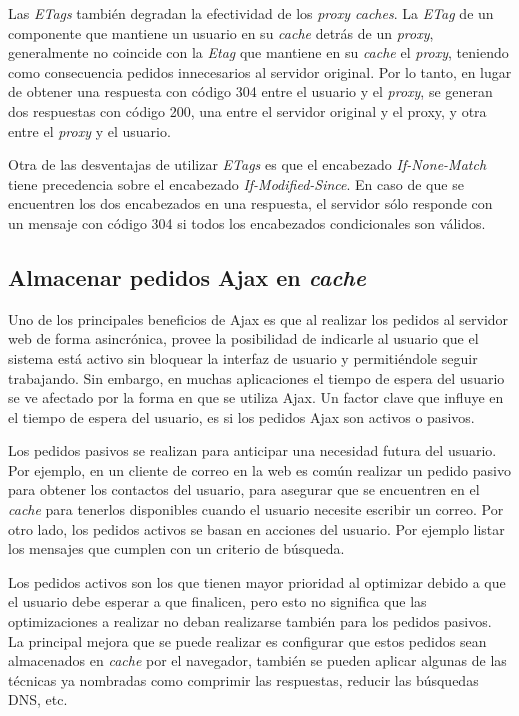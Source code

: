 Las \emph{ETags} también degradan la efectividad de los \emph{proxy caches}. La \emph{ETag} de un componente que mantiene un usuario en su \emph{cache} detrás de un
\emph{proxy}, generalmente no coincide con la \emph{Etag} que mantiene en su \emph{cache} el \emph{proxy}, teniendo como consecuencia pedidos innecesarios al servidor
original. Por lo tanto, en lugar de obtener una respuesta con código 304 entre el usuario y el \emph{proxy}, se generan dos respuestas con código 200, una entre el
servidor original y el proxy, y otra entre el \emph{proxy} y el usuario.

Otra de las desventajas de utilizar \emph{ETags} es que el encabezado \emph{If-None-Match} tiene precedencia sobre el encabezado \emph{If-Modified-Since}. En caso de que
se encuentren los dos encabezados en una respuesta, el servidor sólo responde con un mensaje con código 304 si todos los encabezados condicionales son válidos.

\subsection{Almacenar pedidos Ajax en \emph{cache}}

Uno de los principales beneficios de Ajax es que al realizar  los pedidos al servidor web de forma
asincrónica, provee la posibilidad de indicarle al usuario que el sistema está activo sin bloquear la
interfaz de usuario y permitiéndole seguir trabajando.
Sin embargo, en muchas aplicaciones el tiempo de espera del usuario se ve afectado por la forma en que se utiliza Ajax. Un factor clave que influye en el tiempo de espera del usuario, es si
los pedidos Ajax son activos o pasivos.

Los pedidos pasivos se realizan para anticipar una necesidad futura del usuario. Por ejemplo, en un cliente de correo en la web es común realizar un pedido pasivo para
obtener los contactos del usuario, para asegurar que se encuentren en el \emph{cache} para tenerlos disponibles cuando el usuario necesite escribir un correo.
Por otro lado, los pedidos activos se basan en acciones del usuario. Por ejemplo listar los mensajes que cumplen con un criterio de búsqueda.

Los pedidos activos son los que tienen mayor prioridad al optimizar debido a que el usuario debe esperar a que finalicen, pero esto no significa que las optimizaciones a realizar no deban realizarse también para los pedidos pasivos. La principal mejora que se puede realizar es configurar que estos pedidos sean almacenados en \emph{cache} por el navegador, también se pueden
aplicar algunas de las técnicas ya nombradas como comprimir las respuestas, reducir las búsquedas DNS, etc.




